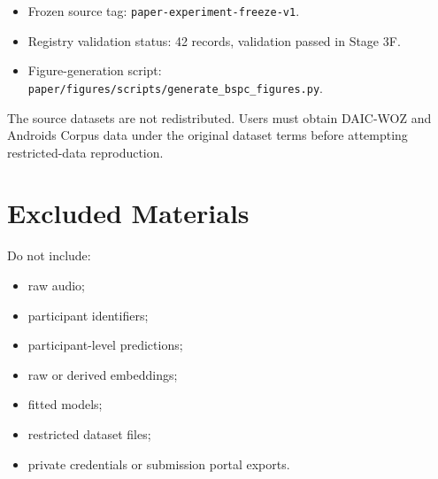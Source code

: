 \documentclass[lettersize,journal]{IEEEtran}
\begin{document}
\begin{itemize}
\item Frozen source tag: \texttt{paper-experiment-freeze-v1}.
\item Registry validation status: 42 records, validation passed in Stage 3F.
\item Figure-generation script: \texttt{paper/figures/scripts/generate\_bspc\_figures.py}.
\end{itemize}

The source datasets are not redistributed. Users must obtain DAIC-WOZ and Androids Corpus data under the original dataset terms before attempting restricted-data reproduction.

\section{Excluded Materials}

Do not include:

\begin{itemize}
\item raw audio;
\item participant identifiers;
\item participant-level predictions;
\item raw or derived embeddings;
\item fitted models;
\item restricted dataset files;
\item private credentials or submission portal exports.
\end{itemize}
\end{document}
